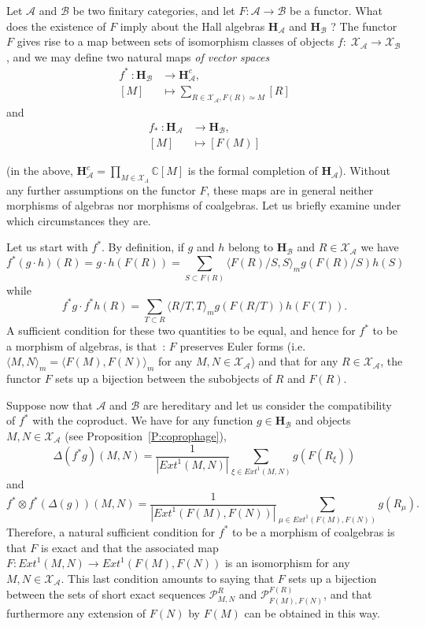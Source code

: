 \documentclass[a4paper,10pt]{amsart}
\def\H{\mathbf{H}}
\def\C{\mathbb{C}}
\def\A{\mathcal{A}}
\numberwithin{equation}{section}
\begin{document}
\vspace{.15in}

Let $\mathcal{A}$ and $\mathcal{B}$ be two finitary categories, and let $F: \mathcal{A} \to \mathcal{B}$ be a functor. What does the existence of $F$ imply about the Hall algebras $\H_{\A}$ and $\H_{\mathcal{B}}$ ? The functor $F$ gives rise to a map between
sets of isomorphism classes of objects $f:\;\mathcal{X}_{\A} \to \mathcal{X}_{\mathcal{B}}$, and we may define two natural maps \textit{of vector spaces}
\begin{align*}
f^*~: \H_{\mathcal{B}} &\to \H_{\mathcal{A}}^c,\\
[M] &\mapsto \sum_{R \in \mathcal{X}_{\A}, F(R) \simeq M} [R]
\end{align*}
and
\begin{align*}
f_*~: \H_{\mathcal{A}} &\to \H_{\mathcal{B}},\\
 [M] & \mapsto [F(M)]
\end{align*}

\noindent
(in the above, $\H_{\A}^c=\prod_{M \in \mathcal{X}_A} \C [M]$ is the formal completion of $\H_{\A}$).
Without any further assumptions on the functor $F$, these maps are in general neither morphisms of algebras nor morphisms of coalgebras. Let us briefly examine under which circumstances they are.

\vspace{.1in}

Let us start with $f^*$. By definition, if $g$ and $h$ belong to $\H_{\mathcal{B}}$ and $R \in \mathcal{X}_{\A}$ we have
$$f^* (g \cdot h) (R)=g \cdot h (F(R))=\sum_{S \subset F(R)} \langle F(R)/S, S \rangle_m g(F(R)/S) h(S)$$
while
$$f^*g \cdot f^* h (R)= \sum_{T \subset R} \langle R/T, T \rangle_m g(F(R/T)) h(F(T)).$$
A sufficient condition for these two quantities to be equal, and hence for $f^*$ to be a morphism of algebras, is that~: $F$ preserves Euler forms (i.e. $\langle M, N \rangle_m = \langle F(M), F(N) \rangle_m$ for any $M,N \in \mathcal{X}_{\A}$) and that for any $R \in \mathcal{X}_{\A}$, the functor $F$ sets up a bijection between the subobjects of $R$ and $F(R)$.

Suppose now that $\A$ and $\mathcal{B}$ are hereditary and let us consider the compatibility of $f^*$ with the coproduct. We have for any function $g \in \H_{\mathcal{B}}$ and objects $M,N \in \mathcal{X}_{\A}$ (see Proposition~\ref{P:coprophage}),
$$\Delta (f^* g) (M,N)=\frac{1}{| {Ext}^1(M,N)|}  \sum_{\xi \in {Ext}^1(M,N)} g(F(R_{\xi}))$$
and
$$f^* \otimes f^* (\Delta(g))(M,N)= \frac{1}{|{Ext}^1(F(M),F(N))|} \sum_{\mu \in {Ext}^1(F(M),F(N))}g(R_{\mu}).$$
Therefore, a natural sufficient condition for $f^*$ to be a morphism of coalgebras is that $F$ is exact and that the associated map $F: {Ext}^1(M,N) \to {Ext}^1(F(M),F(N))$ is an isomorphism for any $M,N \in \mathcal{X}_{\A}$. This last condition amounts to saying that $F$ sets up a bijection between the sets of short exact sequences $\mathcal{P}_{M,N}^R$ and $\mathcal{P}^{F(R)}_{F(M),F(N)}$, and that furthermore any extension of $F(N)$ by $F(M)$ can be obtained in this way.
\end{document}
